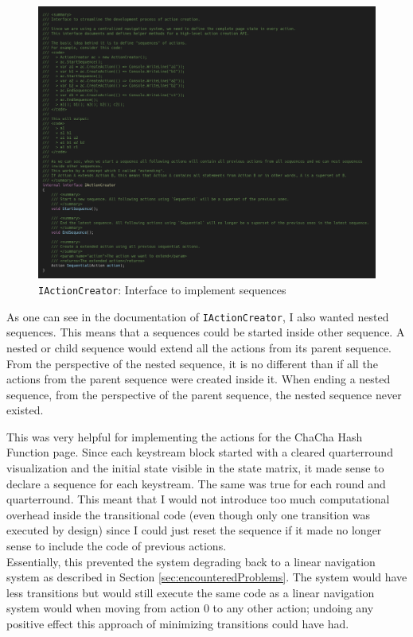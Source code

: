 \begin{figure}
\centering
\caption{\texttt{IActionCreator}: Interface to implement sequences}
\label{fig:navsystem.iactioncreator}
\includegraphics[width=\textwidth]{figures/code/nav-arch/IActionCreator-full.png}
\end{figure}

As one can see in the documentation of \texttt{IActionCreator}, I also wanted nested sequences. This means that a sequences could be started inside other sequence. A nested or child sequence would extend all the actions from its parent sequence. From the perspective of the nested sequence, it is no different than if all the actions from the parent sequence were created inside it. When ending a nested sequence, from the perspective of the parent sequence, the nested sequence never existed.

This was very helpful for implementing the actions for the ChaCha Hash Function page. Since each keystream block started with a cleared quarterround visualization and the initial state visible in the state matrix, it made sense to declare a sequence for each keystream. The same was true for each round and quarterround. This meant that I would not introduce too much computational overhead inside the transitional code (even though only one transition was executed by design) since I could just reset the sequence if it made no longer sense to include the code of previous actions. \\
Essentially, this prevented the system degrading back to a linear navigation system as described in Section \ref{sec:encounteredProblems}. The system would have less transitions but would still execute the same code as a linear navigation system would when moving from action 0 to any other action; undoing any positive effect this approach of minimizing transitions could have had.

